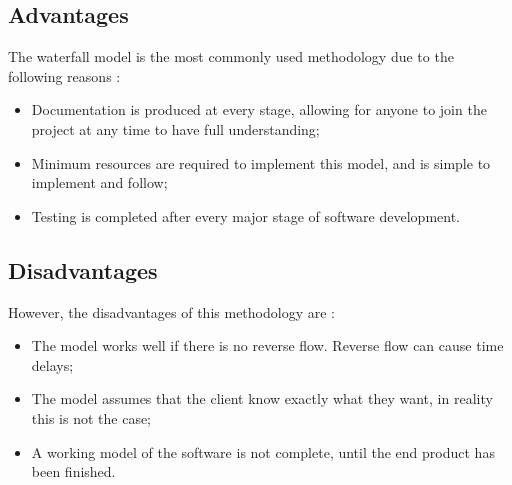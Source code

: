 \subsection{Advantages}
The waterfall model is the most commonly used methodology due to the following 
reasons \citep{alam:2012:Online}:
\begin{itemize}
	\item Documentation is produced at every stage, allowing for anyone to join
        the project at any time to have full understanding;
  \item Minimum resources are required to implement this model, and is simple
        to implement and follow;
  \item Testing is completed after every major stage of software development.
\end{itemize}

\subsection{Disadvantages}
However, the disadvantages of this methodology are \citep{alam:2012:Online}:
\begin{itemize}
	\item The model works well if there is no reverse flow. Reverse flow can 
        cause time delays;
  \item The model assumes that the client know exactly what they want, in 
        reality this is not the case;
  \item A working model of the software is not complete, until the end product 
        has been finished.
\end{itemize}
